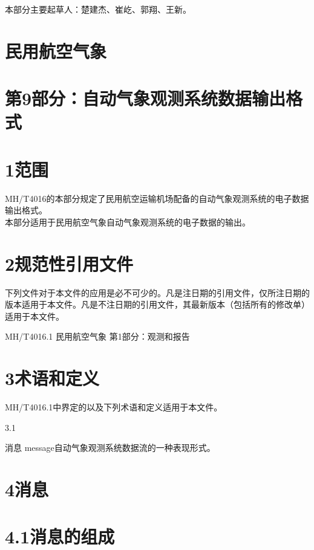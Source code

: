 \documentclass[
  10
]{article}
\begin{document}
本部分主要起草人：楚建杰、崔屹、郭翔、王新。

\section{民用航空气象}\label{ux6c11ux7528ux822aux7a7aux6c14ux8c61}

\section{第9部分：自动气象观测系统数据输出格式}\label{ux7b2c9ux90e8ux5206ux81eaux52a8ux6c14ux8c61ux89c2ux6d4bux7cfbux7edfux6570ux636eux8f93ux51faux683cux5f0f}

\section{1范围}\label{ux8303ux56f4}

MH/T4016的本部分规定了民用航空运输机场配备的自动气象观测系统的电子数据输出格式。\\
本部分适用于民用航空气象自动气象观测系统的电子数据的输出。

\section{2规范性引用文件}\label{ux89c4ux8303ux6027ux5f15ux7528ux6587ux4ef6}

下列文件对于本文件的应用是必不可少的。凡是注日期的引用文件，仅所注日期的版本适用于本文件。凡是不注日期的引用文件，其最新版本（包括所有的修改单）适用于本文件。

MH/T4016.1 民用航空气象 第1部分：观测和报告

\section{3术语和定义}\label{ux672fux8bedux548cux5b9aux4e49}

MH/T4016.1中界定的以及下列术语和定义适用于本文件。

3.1

消息 message自动气象观测系统数据流的一种表现形式。

\section{4消息}\label{ux6d88ux606f}

\section{4.1消息的组成}\label{ux6d88ux606fux7684ux7ec4ux6210}
\end{document}
